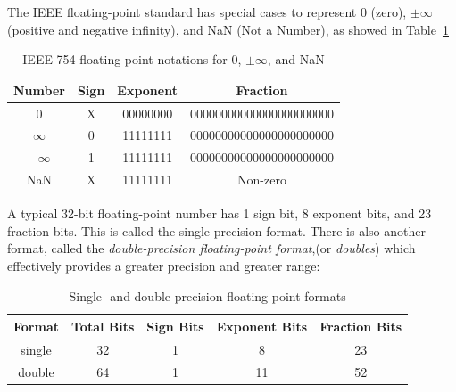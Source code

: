 \documentclass[12pt]{article}
\numberwithin{figure}{subsection}
\numberwithin{table}{subsection}
\numberwithin{equation}{subsection}
\begin{document}
\begin{enumerate}
  The IEEE floating-point standard has special cases to represent 0 (zero), $\pm \infty$ (positive and negative infinity), and NaN (Not a Number), as showed in Table~\ref{tab:ieee_floating_point_special_notations}

  \begin{table}[ht]
    \centering
    \begin{tabular}{ | c | c | c | c | }
    \hline
    \textbf{Number} & \textbf{Sign} & \textbf{Exponent} & \textbf{Fraction}       \\ \hline
    0               & X             & 00000000          & 00000000000000000000000 \\ \hline
    $\infty$        & 0             & 11111111          & 00000000000000000000000 \\ \hline
    $- \infty$      & 1             & 11111111          & 00000000000000000000000 \\ \hline
    NaN             & X             & 11111111          & Non-zero                \\ \hline
    \end{tabular}
    \caption{IEEE 754 floating-point notations for 0, $\pm \infty$, and NaN}
    \label{tab:ieee_floating_point_special_notations}
  \end{table}

  A typical 32-bit floating-point number has 1 sign bit, 8 exponent bits, and 23 fraction bits. This is called the single-precision format. There is also another format, called the \textit{double-precision floating-point format},(or \textit{doubles}) which effectively provides a greater precision and greater range:

  \begin{table}[ht]
    \centering
    \begin{tabular}{ | c | c | c | c | c | }
    \hline
    \textbf{Format} & \textbf{Total Bits} & \textbf{Sign Bits} & \textbf{Exponent Bits} & \textbf{Fraction Bits} \\ \hline
    single          & 32                  & 1                  & 8                      & 23                     \\ \hline
    double          & 64                  & 1                  & 11                     & 52                     \\ \hline
    \end{tabular}
    \caption{Single- and double-precision floating-point formats}
  \end{table}


\end{enumerate}
\end{document}
